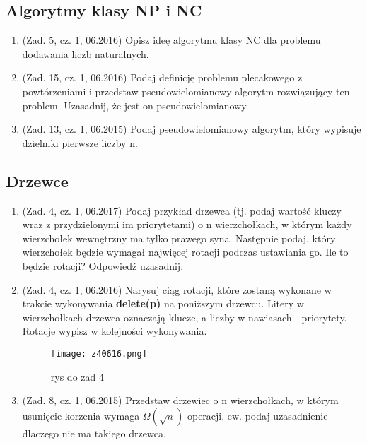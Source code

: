 \documentclass[10pt]{article}%
\begin{document}
\subsection*{Algorytmy klasy NP i NC}

\begin{enumerate}

\item (Zad. 5, cz. 1, 06.2016) Opisz ideę algorytmu klasy NC dla problemu dodawania liczb naturalnych.

\item (Zad. 15, cz. 1, 06.2016) Podaj definicję problemu plecakowego z powtórzeniami i przedstaw pseudowielomianowy algorytm rozwiązujący ten problem. Uzasadnij, że jest on pseudowielomianowy.

\item (Zad. 13, cz. 1, 06.2015) Podaj pseudowielomianowy algorytm, który wypisuje dzielniki pierwsze liczby n.

\end{enumerate}


\subsection*{Drzewce}

\begin{enumerate}

\item(Zad. 4, cz. 1, 06.2017) Podaj przykład drzewca (tj. podaj wartość kluczy wraz z przydzielonymi im priorytetami) o n wierzchołkach, w którym każdy wierzchołek wewnętrzny ma tylko prawego syna. Następnie podaj, który wierzchołek będzie wymagał najwięcej rotacji podczas ustawiania go. Ile to będzie rotacji? Odpowiedź uzasadnij.

\item (Zad. 4, cz. 1, 06.2016) Narysuj ciąg rotacji, które zostaną wykonane w trakcie wykonywania \textbf{delete(p)} na poniższym drzewcu. Litery w wierzchołkach drzewca oznaczają klucze, a liczby w nawiasach - priorytety. Rotacje wypisz w kolejności wykonywania.
\begin{figure}[H]
	\begin{center}
		\texttt{[image: z40616.png]}
	\end{center}
	\caption{rys do zad 4}
\end{figure}

\item (Zad. 8, cz. 1, 06.2015) Przedstaw drzewiec o n wierzchołkach, w którym usunięcie korzenia wymaga $\Omega(\sqrt{n})$ operacji, ew. podaj uzasadnienie dlaczego nie ma takiego drzewca.


\end{enumerate}
\end{document}
